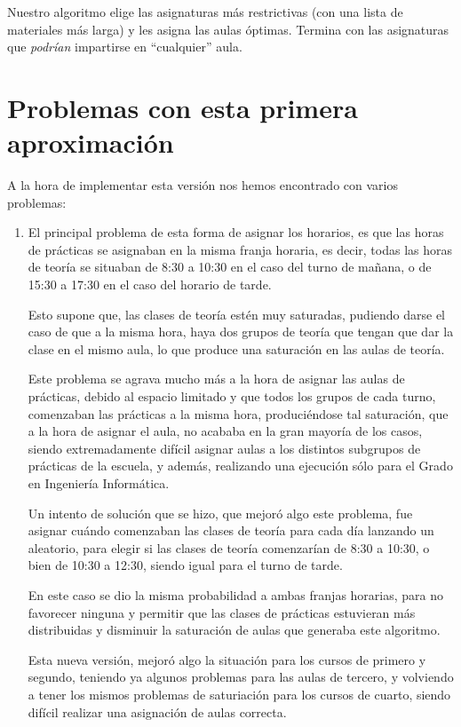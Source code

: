Nuestro algoritmo elige las asignaturas más restrictivas (con una lista de materiales más larga) y les asigna las aulas óptimas. Termina con las asignaturas que \textit{podrían} impartirse en ``cualquier'' aula.

\section{Problemas con esta primera aproximación}
A la hora de implementar esta versión nos hemos encontrado con varios problemas:

\begin{enumerate}[---]
    \item El principal problema de esta forma de asignar los horarios, es que las horas de prácticas se asignaban en la misma franja horaria, es decir, todas las horas de teoría se situaban de 8:30 a 10:30 en el caso del turno de mañana, o de 15:30 a 17:30 en el caso del horario de tarde.

    Esto supone que, las clases de teoría estén muy saturadas, pudiendo darse el caso de que a la misma hora, haya dos grupos de teoría que tengan que dar la clase en el mismo aula, lo que produce una saturación en las aulas de teoría.

    Este problema se agrava mucho más a la hora de asignar las aulas de prácticas, debido al espacio limitado y que todos los grupos de cada turno, comenzaban las prácticas a la misma hora, produciéndose tal saturación, que a la hora de asignar el aula, no acababa en la gran mayoría de los casos, siendo extremadamente difícil asignar aulas a los distintos subgrupos de prácticas de la escuela, y además, realizando una ejecución sólo para el Grado en Ingeniería Informática.

    Un intento de solución que se hizo, que mejoró algo este problema, fue asignar cuándo comenzaban las clases de teoría para cada día lanzando un aleatorio, para elegir si las clases de teoría comenzarían de 8:30 a 10:30, o bien de 10:30 a 12:30, siendo igual para el turno de tarde.

    En este caso se dio la misma probabilidad a ambas franjas horarias, para no favorecer ninguna y permitir que las clases de prácticas estuvieran más distribuidas y disminuir la saturación de aulas que generaba este algoritmo.

    Esta nueva versión, mejoró algo la situación para los cursos de primero y segundo, teniendo ya algunos problemas para las aulas de tercero, y volviendo a tener los mismos problemas de saturiación para los cursos de cuarto, siendo difícil realizar una asignación de aulas correcta.


\end{enumerate}
